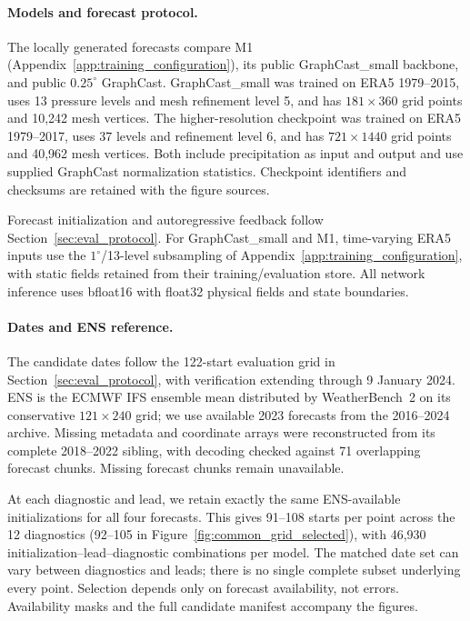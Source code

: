 \documentclass{article}
\newcommand{\vfourchange}[1]{{\color{blue}#1}}
\begin{document}
\paragraph{\vfourchange{Models and forecast protocol.}}
\vfourchange{The locally generated forecasts compare M1 (Appendix~\ref{app:training_configuration}), its public GraphCast\_small backbone, and public $0.25^\circ$ GraphCast. GraphCast\_small was trained on ERA5 1979--2015, uses 13 pressure levels and mesh refinement level 5, and has $181\times360$ grid points and 10,242 mesh vertices. The higher-resolution checkpoint was trained on ERA5 1979--2017, uses 37 levels and refinement level 6, and has $721\times1440$ grid points and 40,962 mesh vertices. Both include precipitation as input and output and use supplied GraphCast normalization statistics. Checkpoint identifiers and checksums are retained with the figure sources.}

\vfourchange{Forecast initialization and autoregressive feedback follow Section~\ref{sec:eval_protocol}. For GraphCast\_small and M1, time-varying ERA5 inputs use the $1^\circ$/13-level subsampling of Appendix~\ref{app:training_configuration}, with static fields retained from their training/evaluation store. All network inference uses bfloat16 with float32 physical fields and state boundaries.}

\paragraph{\vfourchange{Dates and ENS reference.}}
\vfourchange{The candidate dates follow the 122-start evaluation grid in Section~\ref{sec:eval_protocol}, with verification extending through 9 January 2024. ENS is the ECMWF IFS ensemble mean distributed by WeatherBench~2 on its conservative $121\times240$ grid; we use available 2023 forecasts from the 2016--2024 archive. Missing metadata and coordinate arrays were reconstructed from its complete 2018--2022 sibling, with decoding checked against 71 overlapping forecast chunks. Missing forecast chunks remain unavailable.}

\vfourchange{At each diagnostic and lead, we retain exactly the same ENS-available initializations for all four forecasts. This gives 91--108 starts per point across the 12 diagnostics (92--105 in Figure~\ref{fig:common_grid_selected}), with 46,930 initialization--lead--diagnostic combinations per model. The matched date set can vary between diagnostics and leads; there is no single complete subset underlying every point. Selection depends only on forecast availability, not errors. Availability masks and the full candidate manifest accompany the figures.}
\end{document}
